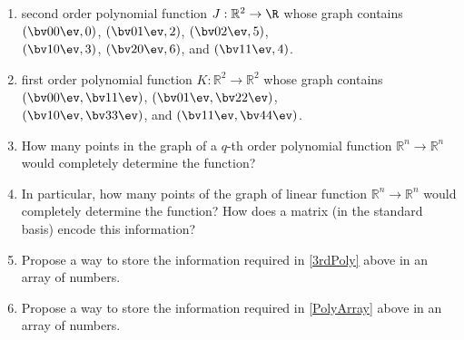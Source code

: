 \begin{enumerate}
\begin{enumerate}
\item second order polynomial function $J:\mathbb{R}^2 \to \R $ whose graph contains 
$\left(  \bv 0\\0 \ev , 0\right)$,  %
$\left(  \bv 0\\1 \ev , 2\right)$, %
$\left(  \bv 0\\2 \ev , 5\right)$, \\[.2cm]
$\left(  \bv 1\\0 \ev , 3\right)$,   %
$\left(  \bv 2\\0 \ev , 6\right)$,  and %
$\left(  \bv 1\\1 \ev , 4\right)$. %

\item  first order polynomial function $K:\mathbb{R}^2 \to \mathbb{R}^2 $ whose graph contains 
$\left(  \bv 0\\0 \ev , \bv 1\\1 \ev \right)$, 
$\left(  \bv 0\\1 \ev , \bv 2\\2 \ev\right)$, \\[.2cm]
$\left(  \bv 1\\0 \ev , \bv 3\\3 \ev  \right)$,  and
$\left(  \bv 1\\1 \ev , \bv 4\\4 \ev\right)$.
\\

\item \label{PolyArray}How many points in the graph of a $q$-th order polynomial function $\mathbb{R}^n \to \mathbb{R}^n$ would completely determine the function? 


\item In particular, how many points of the graph of linear function $\mathbb{R}^n \to \mathbb{R}^n$ would completely determine the function? How does a matrix (in the standard basis) encode this information?

\item Propose a way to store the information required in \ref{3rdPoly} above in an array of numbers.

\item Propose a way to store the information required in \ref{PolyArray} above in an array of numbers.
\end{enumerate}






\end{enumerate}

